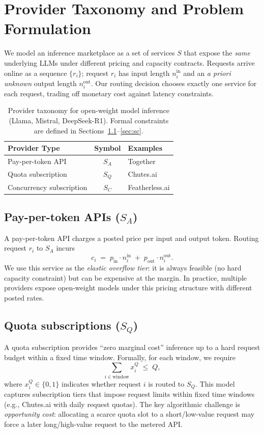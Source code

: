 \section{Provider Taxonomy and Problem Formulation}
\label{sec:providers}

We model an inference marketplace as a set of services $S$ that expose the \emph{same} underlying LLMs under different pricing and capacity contracts.
Requests arrive online as a sequence $\{r_i\}$; request $r_i$ has input length $n_i^{\text{in}}$ and an \emph{a priori unknown} output length $n_i^{\text{out}}$.
Our routing decision chooses exactly one service for each request, trading off monetary cost against latency constraints.
\begin{table}[t]
\centering
\begin{tabular}{@{}lcl@{}}
\toprule
\textbf{Provider Type} & \textbf{Symbol} & \textbf{Examples} \\
\midrule
Pay-per-token API & $S_A$ & Together \\
Quota subscription & $S_Q$ & Chutes.ai \\
Concurrency subscription & $S_C$ & Featherless.ai \\
\bottomrule
\end{tabular}
\caption{Provider taxonomy for open-weight model inference (Llama, Mistral, DeepSeek-R1). Formal constraints are defined in Sections~\ref{sec:sa}--\ref{sec:sc}.}
\label{tab:provider_taxonomy}
\end{table}

\subsection{Pay-per-token APIs ($S_A$)}
\label{sec:sa}
A pay-per-token API charges a posted price per input and output token.
Routing request $r_i$ to $S_A$ incurs
\[
c_i \;=\; p_{\text{in}} \cdot n_i^{\text{in}} \;+\; p_{\text{out}} \cdot n_i^{\text{out}}.
\]
We use this service as the \emph{elastic overflow tier}: it is always feasible (no hard capacity constraint) but can be expensive at the margin.
In practice, multiple providers expose open-weight models under this pricing structure with different posted rates.\cite{together_pricing,fireworks_pricing,groq_pricing,deepseek_api_pricing}

\subsection{Quota subscriptions ($S_Q$)}
\label{sec:sq}
A quota subscription provides ``zero marginal cost'' inference up to a hard request budget within a fixed time window.
Formally, for each window, we require
\[
\sum_{i \in \text{window}} x_i^{Q} \;\le\; Q,
\]
where $x_i^{Q}\in\{0,1\}$ indicates whether request $i$ is routed to $S_Q$.
This model captures subscription tiers that impose request limits within fixed time windows (e.g., Chutes.ai with daily request quotas).\cite{chutes_pricing}
The key algorithmic challenge is \emph{opportunity cost}: allocating a scarce quota slot to a short/low-value request may force a later long/high-value request to the metered API.

